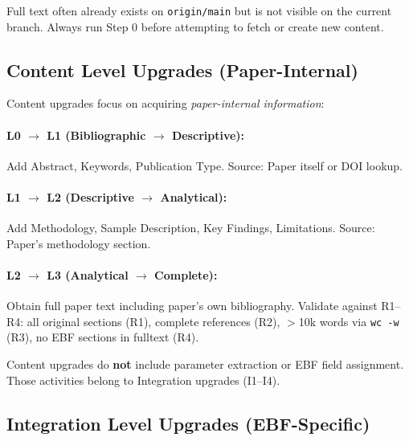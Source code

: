 \begin{tcolorbox}[colback=yellow!10!white, colframe=yellow!75!black,
    title=Learning INT-ACE-002: Always Check Main First]
Full text often already exists on \texttt{origin/main} but is not visible on
the current branch. Always run Step 0 before attempting to fetch or create
new content.
\end{tcolorbox}

\subsection{Content Level Upgrades (Paper-Internal)}

Content upgrades focus on acquiring \textit{paper-internal information}:

\paragraph{L0 $\rightarrow$ L1 (Bibliographic $\rightarrow$ Descriptive):}
Add Abstract, Keywords, Publication Type. Source: Paper itself or DOI lookup.

\paragraph{L1 $\rightarrow$ L2 (Descriptive $\rightarrow$ Analytical):}
\label{sec:upgrade-l2}
Add Methodology, Sample Description, Key Findings, Limitations. Source: Paper's methodology section.

\paragraph{L2 $\rightarrow$ L3 (Analytical $\rightarrow$ Complete):}
Obtain full paper text including paper's own bibliography. Validate against R1--R4: all original sections (R1), complete references (R2), $>$10k words via \texttt{wc -w} (R3), no EBF sections in fulltext (R4).

\begin{tcolorbox}[colback=yellow!5!white, colframe=yellow!75!black,
    title=MECE Reminder: Content Upgrades]
Content upgrades do \textbf{not} include parameter extraction or EBF field assignment.
Those activities belong to Integration upgrades (I1--I4).
\end{tcolorbox}

\subsection{Integration Level Upgrades (EBF-Specific)}

